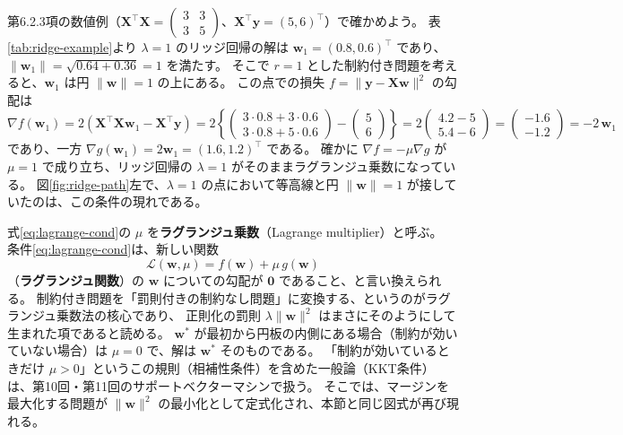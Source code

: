 第6.2.3項の数値例（$\bm{X}^\top\bm{X} = \begin{pmatrix} 3 & 3 \\ 3 & 5 \end{pmatrix}$、$\bm{X}^\top\bm{y} = (5, 6)^\top$）で確かめよう。
表\ref{tab:ridge-example}より $\lambda = 1$ のリッジ回帰の解は $\bm{w}_1 = (0.8, 0.6)^\top$ であり、
$\|\bm{w}_1\| = \sqrt{0.64 + 0.36} = 1$ を満たす。
そこで $r = 1$ とした制約付き問題を考えると、$\bm{w}_1$ は円 $\|\bm{w}\| = 1$ の上にある。
この点での損失 $f = \|\bm{y} - \bm{X}\bm{w}\|^2$ の勾配は
\begin{equation*}
  \nabla f(\bm{w}_1) = 2(\bm{X}^\top\bm{X}\bm{w}_1 - \bm{X}^\top\bm{y})
  = 2\left\{ \begin{pmatrix} 3 \cdot 0.8 + 3 \cdot 0.6 \\ 3 \cdot 0.8 + 5 \cdot 0.6 \end{pmatrix} - \begin{pmatrix} 5 \\ 6 \end{pmatrix} \right\}
  = 2\begin{pmatrix} 4.2 - 5 \\ 5.4 - 6 \end{pmatrix}
  = \begin{pmatrix} -1.6 \\ -1.2 \end{pmatrix}
  = -2\,\bm{w}_1
\end{equation*}
であり、一方 $\nabla g(\bm{w}_1) = 2\bm{w}_1 = (1.6, 1.2)^\top$ である。
確かに $\nabla f = -\mu\nabla g$ が $\mu = 1$ で成り立ち、リッジ回帰の $\lambda = 1$ がそのままラグランジュ乗数になっている。
図\ref{fig:ridge-path}左で、$\lambda = 1$ の点において等高線と円 $\|\bm{w}\| = 1$ が接していたのは、この条件の現れである。

式\eqref{eq:lagrange-cond}の $\mu$ を\textbf{ラグランジュ乗数}（Lagrange multiplier）と呼ぶ。
条件\eqref{eq:lagrange-cond}は、新しい関数
\begin{equation}
  \mathcal{L}(\bm{w}, \mu) = f(\bm{w}) + \mu\,g(\bm{w})
  \label{eq:lagrangian}
\end{equation}
（\textbf{ラグランジュ関数}）の $\bm{w}$ についての勾配が $\bm{0}$ であること、と言い換えられる。
制約付き問題を「罰則付きの制約なし問題」に変換する、というのがラグランジュ乗数法の核心であり、
正則化の罰則 $\lambda\|\bm{w}\|^2$ はまさにそのようにして生まれた項であると読める。
$\bm{w}^*$ が最初から円板の内側にある場合（制約が効いていない場合）は $\mu = 0$ で、解は $\bm{w}^*$ そのものである。
「制約が効いているときだけ $\mu > 0$」というこの規則（相補性条件）を含めた一般論（KKT条件）は、第10回・第11回のサポートベクターマシンで扱う。
そこでは、マージンを最大化する問題が $\|\bm{w}\|^2$ の最小化として定式化され、本節と同じ図式が再び現れる。

